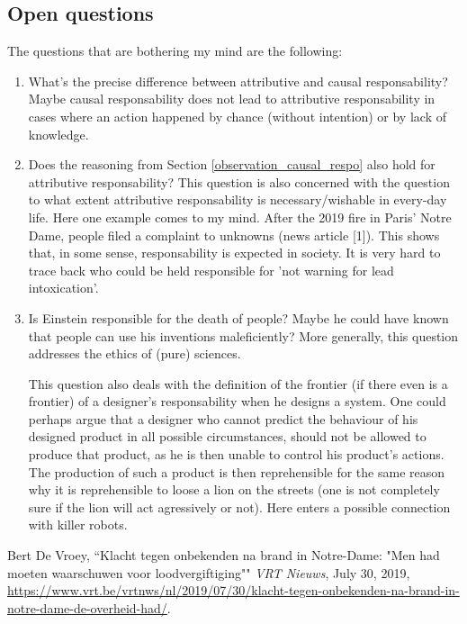 \documentclass[../main/main.tex]{subfiles}
\begin{document}
\subsection{Open questions}
The questions that are bothering my mind are the following:
\begin{enumerate}
\item What's the precise difference between attributive and causal responsability? Maybe causal responsability does not lead to attributive responsability in cases where an action happened by chance (without intention) or by lack of knowledge. 

\item Does the reasoning from Section \ref{observation_causal_respo} also hold for attributive responsability? This question is also concerned with the question to what extent attributive responsability is necessary/wishable in every-day life. Here one example comes to my mind. After the 2019 fire in Paris' Notre Dame, people filed a complaint to unknowns (news article [1]). This shows that, in some sense, responsability is expected in society. It is very hard to trace back who could be held responsible for 'not warning for lead intoxication'.

\item Is Einstein responsible for the death of people? Maybe he could have known that people can use his inventions maleficiently? More generally, this question addresses the ethics of (pure) sciences. 

This question also deals with the definition of the frontier (if there even is a frontier) of a designer's responsability when he designs a system. One could perhaps argue that a designer who cannot predict the behaviour of his designed product in all possible circumstances, should not be allowed to produce that product, as he is then unable to control his product's actions. The production of such a product is then reprehensible for the same reason why it is reprehensible to loose a lion on the streets (one is not completely sure if the lion will act agressively or not). Here enters a possible connection with killer robots. 
\end{enumerate}

\begin{thebibliography}{100}  
 Bert De Vroey, ``Klacht tegen onbekenden na brand in Notre-Dame: "Men had moeten waarschuwen voor loodvergiftiging"" \emph{VRT Nieuws}, July 30, 2019, \url{https://www.vrt.be/vrtnws/nl/2019/07/30/klacht-tegen-onbekenden-na-brand-in-notre-dame-de-overheid-had/}.
\end{thebibliography}
\end{document}
